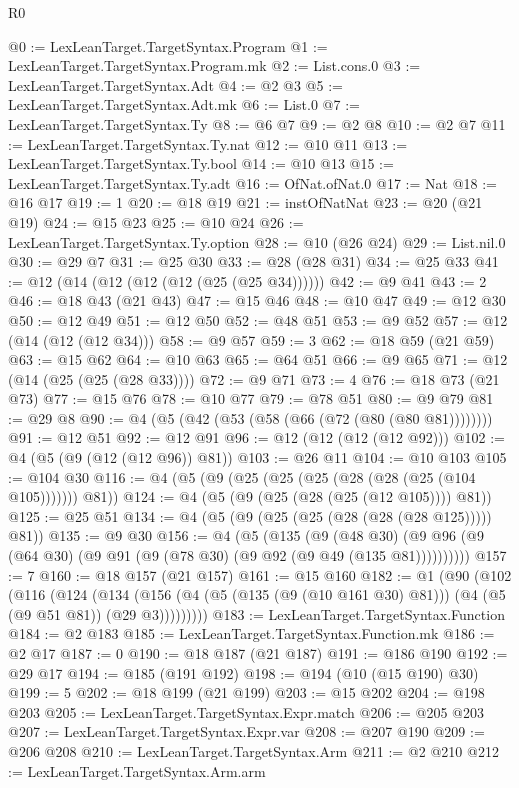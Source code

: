 \begin{lexlean}{R0}
\begin{coremodule}
@0 := LexLeanTarget.TargetSyntax.Program
@1 := LexLeanTarget.TargetSyntax.Program.mk
@2 := List.cons.{0}
@3 := LexLeanTarget.TargetSyntax.Adt
@4 := @2 @3
@5 := LexLeanTarget.TargetSyntax.Adt.mk
@6 := List.{0}
@7 := LexLeanTarget.TargetSyntax.Ty
@8 := @6 @7
@9 := @2 @8
@10 := @2 @7
@11 := LexLeanTarget.TargetSyntax.Ty.nat
@12 := @10 @11
@13 := LexLeanTarget.TargetSyntax.Ty.bool
@14 := @10 @13
@15 := LexLeanTarget.TargetSyntax.Ty.adt
@16 := OfNat.ofNat.{0}
@17 := Nat
@18 := @16 @17
@19 := 1
@20 := @18 @19
@21 := instOfNatNat
@23 := @20 (@21 @19)
@24 := @15 @23
@25 := @10 @24
@26 := LexLeanTarget.TargetSyntax.Ty.option
@28 := @10 (@26 @24)
@29 := List.nil.{0}
@30 := @29 @7
@31 := @25 @30
@33 := @28 (@28 @31)
@34 := @25 @33
@41 := @12 (@14 (@12 (@12 (@12 (@25 (@25 @34))))))
@42 := @9 @41
@43 := 2
@46 := @18 @43 (@21 @43)
@47 := @15 @46
@48 := @10 @47
@49 := @12 @30
@50 := @12 @49
@51 := @12 @50
@52 := @48 @51
@53 := @9 @52
@57 := @12 (@14 (@12 (@12 @34)))
@58 := @9 @57
@59 := 3
@62 := @18 @59 (@21 @59)
@63 := @15 @62
@64 := @10 @63
@65 := @64 @51
@66 := @9 @65
@71 := @12 (@14 (@25 (@25 (@28 @33))))
@72 := @9 @71
@73 := 4
@76 := @18 @73 (@21 @73)
@77 := @15 @76
@78 := @10 @77
@79 := @78 @51
@80 := @9 @79
@81 := @29 @8
@90 := @4 (@5 (@42 (@53 (@58 (@66 (@72 (@80 (@80 @81))))))))
@91 := @12 @51
@92 := @12 @91
@96 := @12 (@12 (@12 (@12 @92)))
@102 := @4 (@5 (@9 (@12 (@12 @96)) @81))
@103 := @26 @11
@104 := @10 @103
@105 := @104 @30
@116 := @4 (@5 (@9 (@25 (@25 (@25 (@28 (@28 (@25 (@104 @105))))))) @81))
@124 := @4 (@5 (@9 (@25 (@28 (@25 (@12 @105)))) @81))
@125 := @25 @51
@134 := @4 (@5 (@9 (@25 (@25 (@28 (@28 (@28 @125))))) @81))
@135 := @9 @30
@156 := @4
    (@5
      (@135
        (@9
          (@48 @30)
          (@9 @96 (@9 (@64 @30) (@9 @91 (@9 (@78 @30) (@9 @92 (@9 @49 (@135 @81))))))))))
@157 := 7
@160 := @18 @157 (@21 @157)
@161 := @15 @160
@182 := @1
    (@90
      (@102
        (@116
          (@124
            (@134
              (@156 (@4 (@5 (@135 (@9 (@10 @161 @30) @81))) (@4 (@5 (@9 @51 @81)) (@29 @3)))))))))
@183 := LexLeanTarget.TargetSyntax.Function
@184 := @2 @183
@185 := LexLeanTarget.TargetSyntax.Function.mk
@186 := @2 @17
@187 := 0
@190 := @18 @187 (@21 @187)
@191 := @186 @190
@192 := @29 @17
@194 := @185 (@191 @192)
@198 := @194 (@10 (@15 @190) @30)
@199 := 5
@202 := @18 @199 (@21 @199)
@203 := @15 @202
@204 := @198 @203
@205 := LexLeanTarget.TargetSyntax.Expr.match
@206 := @205 @203
@207 := LexLeanTarget.TargetSyntax.Expr.var
@208 := @207 @190
@209 := @206 @208
@210 := LexLeanTarget.TargetSyntax.Arm
@211 := @2 @210
@212 := LexLeanTarget.TargetSyntax.Arm.arm

\end{coremodule}
\end{lexlean}
